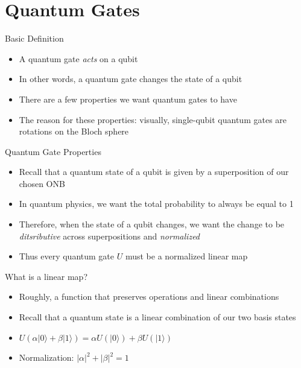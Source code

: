\documentclass[aspectratio=169, handout]{beamer}
\begin{document}
\section{Quantum Gates}
\frame{\sectionpage}

\begin{frame}{Basic Definition}
    \begin{itemize}
        \item A quantum gate \textit{acts} on a qubit \pause
        \item In other words, a quantum gate changes the state of a qubit \pause
        \item There are a few properties we want quantum gates to have \pause
        \item The reason for these properties: visually, single-qubit quantum gates are rotations on the Bloch sphere
    \end{itemize}
\end{frame}

\begin{frame}{Quantum Gate Properties}
    \begin{itemize}
        \item Recall that a quantum state of a qubit is given by a superposition of our chosen ONB \pause
        \item In quantum physics, we want the total probability to always be equal to 1 \pause
        \item Therefore, when the state of a qubit changes, we want the change to be \textit{ditsributive} across superpositions and \textit{normalized} \pause
        \item Thus every quantum gate $U$ must be a normalized linear map
    \end{itemize}
\end{frame}

\begin{frame}{What is a linear map?}
    \begin{itemize}
        \item Roughly, a function that preserves operations and linear combinations \pause
        \item Recall that a quantum state is a linear combination of our two basis states \pause
        \item $U(\alpha | 0 \rangle + \beta | 1 \rangle)=\alpha U(| 0 \rangle) + \beta U(| 1 \rangle)$ \pause
        \item Normalization: $|\alpha|^2 + |\beta|^2 = 1$
    \end{itemize}
\end{frame}
\end{document}
